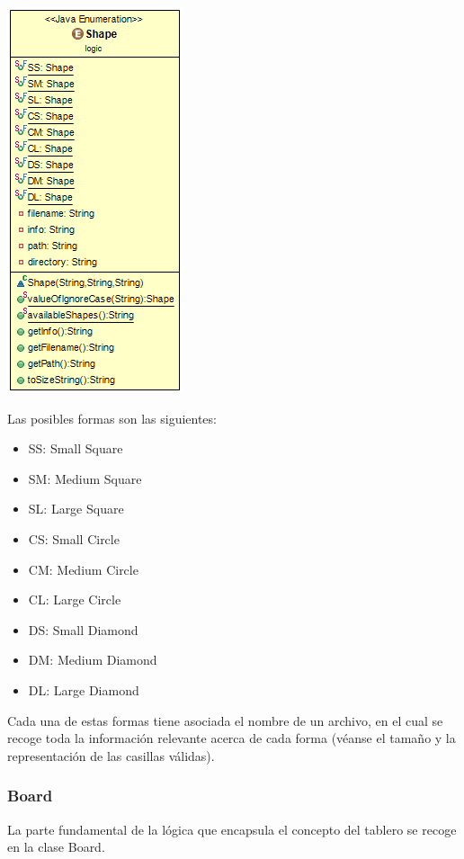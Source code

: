 \documentclass[12pt,a4paper,openright]{book}
\theoremstyle{break}
\begin{document}
\begin{center}
\includegraphics[scale=0.75]{Shape-sprint7.png} 
\end{center}

Las posibles formas son las siguientes:
\begin{itemize}
\item SS: Small Square
\item SM: Medium Square
\item SL: Large Square
\item CS: Small Circle
\item CM: Medium Circle
\item CL: Large Circle
\item DS: Small Diamond
\item DM: Medium Diamond
\item DL: Large Diamond
\end{itemize}

Cada una de estas formas tiene asociada el nombre de un archivo, en el cual se recoge toda la información relevante acerca de cada forma (véanse el tamaño y la representación de las casillas válidas).

\newpage

\subsubsection{Board}

La parte fundamental de la lógica que encapsula el concepto del tablero se recoge en la clase Board.
\end{document}
